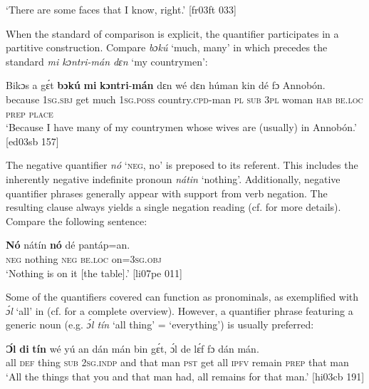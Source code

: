 \glt ‘There are some faces that I know, right.’ [fr03ft 033]
\z

When the standard of comparison is explicit, the quantifier participates in a partitive construction. Compare \textit{bɔkú} ‘much, many’ in  which precedes the standard \textit{mi kɔntri-mán dɛn} ‘my countrymen’:


\ea%
    \label{ex:key:275}
    \gll Bikɔs  a    gɛ́t  \textbf{bɔkú}  \textbf{mi}    \textbf{kɔntri}-\textbf{mán}    dɛn  
wé  dɛn  húman  kin  dé    fɔ  Annobón.\\
because  \textsc{1sg.sbj}  get  much  \textsc{1sg.poss}  country.\textsc{cpd}{}-man  \textsc{pl}
\textsc{sub}  \textsc{3pl}  woman  \textsc{hab}  \textsc{be.loc}  \textsc{prep}  \textsc{place}\\
\glt ‘Because I have many of my countrymen whose wives are (usually) 
in Annobón.’ [ed03sb 157]
\z

The negative quantifier \textit{nó} ‘\textsc{neg}, no’ is preposed to its referent. This includes the inherently negative indefinite pronoun \textit{nátin} ‘nothing’. Additionally, negative quantifier phrases generally appear with support from verb negation. The resulting clause always yields a single negation reading (cf.  for more details). Compare the following sentence: 


\ea%
    \label{ex:key:276}
    \gll \textbf{Nó}  nátín  \textbf{nó}  dé    pantáp=an.\\
\textsc{neg}  nothing  \textsc{neg}  \textsc{be.loc}  on=\textsc{3sg.obj}\\

\glt ‘Nothing is on it [the table].’ [li07pe 011]
\z

Some of the quantifiers covered can function as pronominals, as exemplified with \textit{ɔ́l} ‘all’ in  (cf.  for a complete overview). However, a quantifier phrase featuring a generic noun (e.g. \textit{ɔ́l tín} ‘all thing’ = ‘everything’) is usually preferred: 


\ea%
    \label{ex:key:277}
    \gll \textbf{Ɔ́l}  \textbf{di}  \textbf{tín}    wé  yú    an  dán    mán    bin  gɛ́t,
ɔ́l  de  lɛ́f    fɔ  dán    mán.\\
all  \textsc{def}  thing  \textsc{sub}  \textsc{2sg.indp}  and  that    man    \textsc{pst}  get
all  \textsc{ipfv}  remain  \textsc{prep}   that  man \\

\glt ‘All the things that you and that man had, all remains for that man.’ [hi03cb 191]
\z


